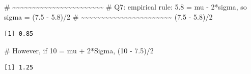 \documentclass[
  letterpaper,
  DIV=11,
  numbers=noendperiod]{scrreprt}
\newenvironment{Shaded}{\begin{snugshade}}{\end{snugshade}}
\newcommand{\CommentTok}[1]{\textcolor[rgb]{0.37,0.37,0.37}{#1}}
\newcommand{\DecValTok}[1]{\textcolor[rgb]{0.68,0.00,0.00}{#1}}
\newcommand{\FloatTok}[1]{\textcolor[rgb]{0.68,0.00,0.00}{#1}}
\newcommand{\NormalTok}[1]{\textcolor[rgb]{0.00,0.23,0.31}{#1}}
\newcommand{\SpecialCharTok}[1]{\textcolor[rgb]{0.37,0.37,0.37}{#1}}
\begin{document}
\begin{Shaded}
\begin{Highlighting}[]
\CommentTok{\# \textasciitilde{}\textasciitilde{}\textasciitilde{}\textasciitilde{}\textasciitilde{}\textasciitilde{}\textasciitilde{}\textasciitilde{}\textasciitilde{}\textasciitilde{}\textasciitilde{}\textasciitilde{}\textasciitilde{}\textasciitilde{}\textasciitilde{}\textasciitilde{}\textasciitilde{}\textasciitilde{}\textasciitilde{}\textasciitilde{}\textasciitilde{}\textasciitilde{}\textasciitilde{}}
\CommentTok{\# Q7: empirical rule: 5.8 = mu {-} 2*sigma, so sigma = (7.5 {-} 5.8)/2}
\CommentTok{\# \textasciitilde{}\textasciitilde{}\textasciitilde{}\textasciitilde{}\textasciitilde{}\textasciitilde{}\textasciitilde{}\textasciitilde{}\textasciitilde{}\textasciitilde{}\textasciitilde{}\textasciitilde{}\textasciitilde{}\textasciitilde{}\textasciitilde{}\textasciitilde{}\textasciitilde{}\textasciitilde{}\textasciitilde{}\textasciitilde{}\textasciitilde{}\textasciitilde{}\textasciitilde{}}
\NormalTok{(}\FloatTok{7.5} \SpecialCharTok{{-}} \FloatTok{5.8}\NormalTok{)}\SpecialCharTok{/}\DecValTok{2}
\end{Highlighting}
\end{Shaded}

\begin{verbatim}
[1] 0.85
\end{verbatim}

\begin{Shaded}
\begin{Highlighting}[]
\CommentTok{\# However, if 10 = mu + 2*Sigma,}
\NormalTok{(}\DecValTok{10} \SpecialCharTok{{-}} \FloatTok{7.5}\NormalTok{)}\SpecialCharTok{/}\DecValTok{2}
\end{Highlighting}
\end{Shaded}

\begin{verbatim}
[1] 1.25
\end{verbatim}
\end{document}
